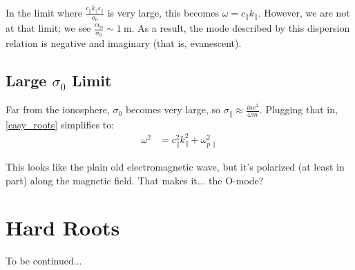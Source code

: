 \documentclass{article}
\begin{document}
In the limit where 
$\frac{c_\parallel k_\parallel \epsilon_\parallel}{\sigma_0}$ is very large, 
this becomes $\omega = c_\parallel k_\parallel$. However, we are not at that 
limit; we see $\frac{c \epsilon_0}{\sigma_0} \sim \SI{1}{\meter}$. As a 
result, the mode described by this dispersion relation is negative and 
imaginary (that is, evanescent). 

\subsection{Large $\sigma_0$ Limit}

Far from the ionosphere, $\sigma_0$ becomes very large, so 
$\sigma_\parallel \approx \frac{i n e^2}{\omega m}$. Plugging that in, 
\cref{easy_roots} simplifies to:
\begin{align}
  \omega^2 &= c_\parallel^2 k_\parallel^2 + \omega_{p \parallel}^2
\end{align}

This looks like the plain old electromagnetic wave, but it's polarized (at 
least in part) along the magnetic field. That makes it... the O-mode?

\section{Hard Roots}

To be continued... 
\end{document}
